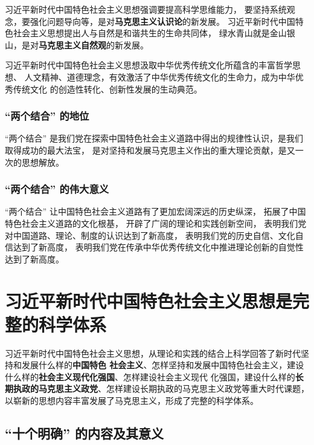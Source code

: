 \documentclass[UTF8,10pt]{ctexbook} %
\begin{document}
习近平新时代中国特色社会主义思想强调要提高科学思维能力，
要坚持系统观念，要强化问题导向等，是对\textbf{马克思主义认识论}的新发展。
习近平新时代中国特色社会主义思想提出人与自然是和谐共生的生命共同体，
绿水青山就是金山银山，是对\textbf{马克思主义自然观}的新发展。

习近平新时代中国特色社会主义思想汲取中华优秀传统文化所蕴含的丰富哲学思想、
人文精神、道德理念，有效激活了中华优秀传统文化的生命力，成为中华优秀传统文化
的创造性转化、创新性发展的生动典范。



\subsubsection{“两个结合” 的地位}

“两个结合” 是我们党在探索中国特色社会主义道路中得出的规律性认识，是我们取得成功的最大法宝，
是对坚持和发展马克思主义作出的重大理论贡献，是又一次的思想解放。

\subsubsection{“两个结合” 的伟大意义}

“两个结合” 让中国特色社会主义道路有了更加宏阔深远的历史纵深，
拓展了中国特色社会主义道路的文化根基，
开辟了广阔的理论和实践创新空间，
表明我们党对中国道路、理论、制度的认识达到了新高度，
表明我们党的历史自信、文化自信达到了新高度，
表明我们党在传承中华优秀传统文化中推进理论创新的自觉性达到了新高度。

\section{习近平新时代中国特色社会主义思想是完整的科学体系}
\setcounter{subsubsection}{0}

习近平新时代中国特色社会主义思想，从理论和实践的结合上科学回答了新时代坚持和发展什么样的\textbf{中国特色
社会主义}、怎样坚持和发展中国特色社会主义，建设什么样的\textbf{社会主义现代化强国}、怎样建设社会主义现代
化强国，建设什么样的\textbf{长期执政的马克思主义政党}、怎样建设长期执政的马克思主义政党等重大时代课题，
以崭新的思想内容丰富发展了马克思主义，形成了完整的科学体系。

\subsection{“十个明确” 的内容及其意义}
\end{document}
